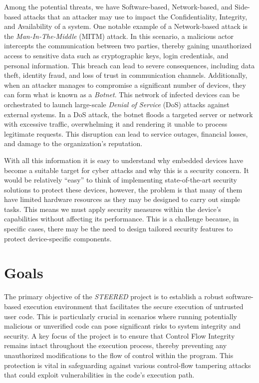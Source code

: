 Among the potential threats, we have Software-based, Network-based, and Side-based
attacks that an attacker may use to impact the Confidentiality, Integrity, and
Availability of a system. One notable example of a Network-based attack is the \textit{Man-In-The-Middle}
(MITM) attack. In this scenario, a malicious actor intercepts the communication
between two parties, thereby gaining unauthorized access to sensitive data such as
cryptographic keys, login credentials, and personal information. This breach can
lead to severe consequences, including data theft, identity fraud, and loss of trust
in communication channels. Additionally, when an attacker manages to compromise a
significant number of devices, they can form what is known as a \textit{Botnet}.
This network of infected devices can be orchestrated to launch large-scale
\textit{Denial of Service} (DoS) attacks against external systems. In a DoS
attack, the botnet floods a targeted server or network with excessive traffic,
overwhelming it and rendering it unable to process legitimate requests. This disruption
can lead to service outages, financial losses, and damage to the organization's reputation.

With all this information it is easy to understand why embedded devices have become
a suitable target for cyber attacks and why this is a security concern. It would
be relatively ``easy'' to think of implementing state-of-the-art security
solutions to protect these devices, however, the problem is that many of them
have limited hardware resources as they may be designed to carry out simple
tasks. This means we must apply security measures within the device's capabilities
without affecting its performance. This is a challenge because, in specific cases,
there may be the need to design tailored security features to protect device-specific
components.

\section{Goals}
\label{sec:intro_goals}

The primary objective of the \textit{STEERED} project is to establish a robust
software-based execution environment that facilitates the secure execution of
untrusted user code. This is particularly crucial in scenarios where running potentially
malicious or unverified code can pose significant risks to system integrity and security.
A key focus of the project is to ensure that Control Flow Integrity remains
intact throughout the execution process, thereby preventing any unauthorized modifications
to the flow of control within the program. This protection is vital in
safeguarding against various control-flow tampering attacks that could exploit
vulnerabilities in the code's execution path.

